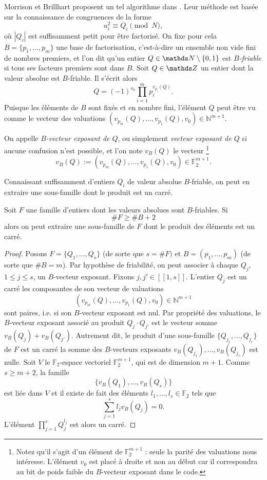 Morrison et Brillhart proposent un tel algorithme dans \cite{MB}. Leur méthode
est basée sur la connaissance de congruences de la forme \[u_i^2 \equiv Q_i
\pmod{N},\] où $| Q_i |$ est suffisamment petit pour être factorisé. On fixe
pour cela $B = \{p_1, \dots, p_m\}$ une base de factorisation, c'est-à-dire un
ensemble non vide fini de nombres premiers, et l'on dit qu'un entier $Q\in
\N\setminus \{0, 1\}$ est \emph{$B$-friable} si tous ses facteurs premiers sont
dans $B$. Soit $Q\in \Z$ un entier dont la valeur absolue est $B$-friable. Il
s'écrit alors \[Q = (-1)^{v_0}\prod_{i=1}^m p_i^{v_{p_i}(Q)}.\] Puisque les
éléments de $B$ sont fixés et en nombre fini, l'élément $Q$ peut être vu comme
le vecteur des valuations $(v_{p_m}(Q), \dots, v_{p_1}(Q), v_0 ) \in
\mathbb{N}^{m+1}$.

\begin{definition}
	On appelle \emph{$B$-vecteur exposant de $Q$}, ou simplement \emph{vecteur
	exposant de $Q$} si aucune confusion n'est possible, et l'on note $v_B(Q)$
	le vecteur \footnote{Notez qu'il s'agit d'un élément de
	$\mathbb{F}_2^{m+1}$ : seule la parité des valuations nous intéresse.
	L'élément $v_0$ est placé à droite et non au début car il correspondra au
	bit de poids faible du $B$-vecteur exposant dans le code.} \[v_B(Q) :=
	(v_{p_m}(Q), \dots, v_{p_1}(Q), v_0 ) \in \mathbb{F}_2^{m+1}.\] 
\end{definition}

Connaissant suffisamment d'entiers $Q_i$ de valeur absolue $B$-friable, on peut
en extraire une sous-famille dont le produit est un carré.

\begin{proposition}
	Soit $F$ une famille d'entiers dont les valeurs absolues sont $B$-friables.
	Si \[\# F \geqslant \# B + 2\] alors on peut extraire une sous-famille de
	$F$ dont le produit des éléments est un carré.
\end{proposition}

\begin{proof}
	Posons $F = \{Q_1, \dots, Q_s\}$ (de sorte que $s = \# F)$ et $B = (p_1,
	\dots, p_m)$ (de sorte que $\# B = m$). Par hypothèse de friabilité, on
	peut associer à chaque $Q_j$, $1\leqslant j \leqslant s$, un $B$-vecteur
	exposant. Fixons $j, j'\in [\![1,s]\!]$. L'entier $Q_j$ est un carré \ssi
	les composantes de son vecteur de valuations \[(v_{p_m}(Q), \dots,
	v_{p_1}(Q), v_0 ) \in \mathbb{N}^{m+1}\] sont paires, i.e. si son
	$B$-vecteur exposant est nul. Par propriété des valuations, le $B$-vecteur
	exposant associé au produit $Q_j\cdot Q_{j'}$ est le vecteur somme
	$v_B(Q_j) + v_B(Q_{j'})$. Autrement dit, le produit d'une sous-famille
	$\{Q_{j_1}, \dots, Q_{j_r}\}$ de $F$ est un carré \ssi la somme des
	$B$-vecteurs exposants $v_B(Q_{j_1}), \dots, v_B(Q_{j_r})$ est nulle. Soit
	$V$ le $\mathbb{F}_2$-espace vectoriel $\mathbb{F}_2^{m+1}$, qui est de
	dimension $m+1$. Comme $s\geqslant m+2$, la famille \[\{v_B(Q_1), \dots,
	v_B(Q_s)\}\] est liée dans $V$ et il existe de fait des éléments $l_1,\dots,
	l_s\in \mathbb{F}_2$ tels que \[\sum_{j=1}^s l_j v_B(Q_j) = 0.\] L'élément
	$\prod_{j=1}^s Q_j^{l_j}$ est alors un carré.
\end{proof}

